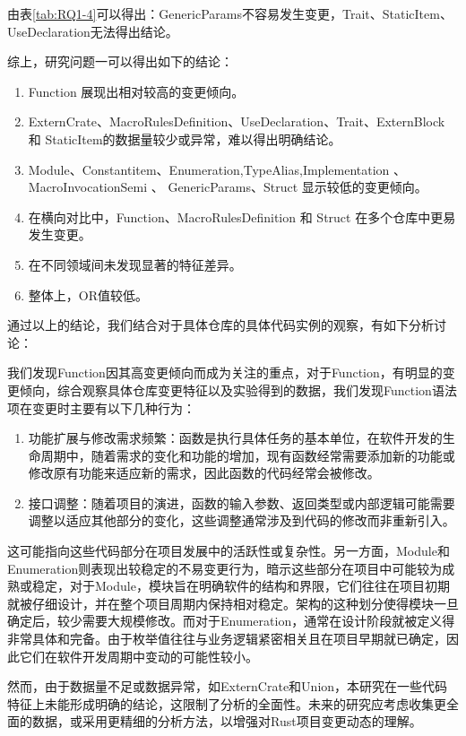 由表\ref{tab:RQ1-4}可以得出：GenericParams不容易发生变更，Trait、StaticItem、UseDeclaration无法得出结论。


综上，研究问题一可以得出如下的结论：

\begin{enumerate}
    \item Function 展现出相对较高的变更倾向。
    \item ExternCrate、MacroRulesDefinition、UseDeclaration、Trait、ExternBlock 和 StaticItem的数据量较少或异常，难以得出明确结论。
    \item Module、Constantitem、Enumeration,TypeAlias,Implementation 、MacroInvocationSemi 、 GenericParams、Struct 显示较低的变更倾向。
    \item 在横向对比中，Function、MacroRulesDefinition 和 Struct 在多个仓库中更易发生变更。
    \item 在不同领域间未发现显著的特征差异。
    \item 整体上，OR值较低。
\end{enumerate}

通过以上的结论，我们结合对于具体仓库的具体代码实例的观察，有如下分析讨论：

我们发现Function因其高变更倾向而成为关注的重点，对于Function，有明显的变更倾向，综合观察具体仓库变更特征以及实验得到的数据，我们发现Function语法项在变更时主要有以下几种行为：
\begin{enumerate}
    \item 功能扩展与修改需求频繁：函数是执行具体任务的基本单位，在软件开发的生命周期中，随着需求的变化和功能的增加，现有函数经常需要添加新的功能或修改原有功能来适应新的需求，因此函数的代码经常会被修改。
    \item 接口调整：随着项目的演进，函数的输入参数、返回类型或内部逻辑可能需要调整以适应其他部分的变化，这些调整通常涉及到代码的修改而非重新引入。
\end{enumerate}

这可能指向这些代码部分在项目发展中的活跃性或复杂性。另一方面，Module和Enumeration则表现出较稳定的不易变更行为，暗示这些部分在项目中可能较为成熟或稳定，对于Module，模块旨在明确软件的结构和界限，它们往往在项目初期就被仔细设计，并在整个项目周期内保持相对稳定。架构的这种划分使得模块一旦确定后，较少需要大规模修改。而对于Enumeration，通常在设计阶段就被定义得非常具体和完备。由于枚举值往往与业务逻辑紧密相关且在项目早期就已确定，因此它们在软件开发周期中变动的可能性较小。

然而，由于数据量不足或数据异常，如ExternCrate和Union，本研究在一些代码特征上未能形成明确的结论，这限制了分析的全面性。未来的研究应考虑收集更全面的数据，或采用更精细的分析方法，以增强对Rust项目变更动态的理解。

